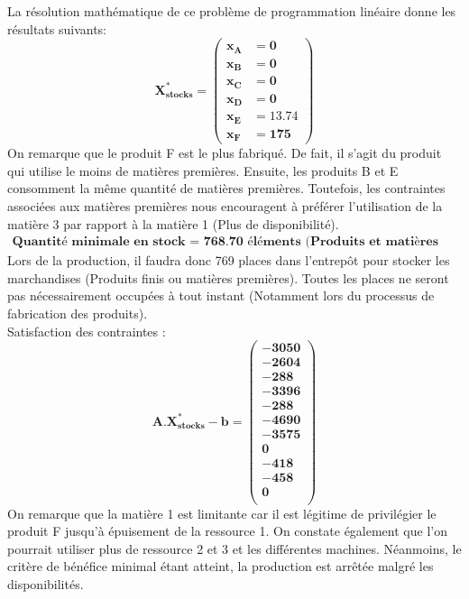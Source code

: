 \documentclass[12pt]{article}
\begin{document}
La résolution mathématique de ce problème de programmation linéaire donne les résultats suivants:
\begin{equation*}
\boldsymbol{X^{*}_{stocks} = 
   \left (
   \begin{aligned}
      x_{A} &= 0 \\
      x_{B} &= 0 \\
      x_{C} &= 0 \\
      x_{D} &= 0 \\
      x_{E} &= 13.74 \\
      x_{F} &= 175 
   \end{aligned}
   \right )
 } 
\end{equation*}
On remarque que le produit F est le plus fabriqué. De fait, il s'agit du produit qui utilise le moins de matières premières. Ensuite, les produits B et E consomment la même quantité de matières premières. Toutefois, les contraintes associées aux matières premières nous encouragent à préférer l'utilisation de la matière 3 par rapport à la matière 1 (Plus de disponibilité).
\begin{align*}
\textbf{Quantité minimale en stock = 768.70 éléments (Produits et matières premières)}
\end{align*}
Lors de la production, il faudra donc 769 places dans l'entrepôt pour stocker les marchandises (Produits finis ou matières premières). Toutes les places ne seront pas nécessairement occupées à tout instant (Notamment lors du processus de fabrication des produits).
\\
Satisfaction des contraintes : 
\begin{equation*}
\boldsymbol{A.X^{*}_{stocks} - b = 
   \left (
   \begin{aligned}
      -3050 \\
      -2604 \\
      -288 \\
      -3396\\
      -288 \\
      -4690 \\
      -3575 \\
      0\\
      -418 \\
      -458\\
      0\\
   \end{aligned}
   \right )
 } 
\end{equation*}
On remarque que la matière 1 est limitante car il est légitime de privilégier le produit F jusqu'à épuisement de la ressource 1.
On constate également que l'on pourrait utiliser plus de ressource 2 et 3 et les différentes machines. Néanmoins, le critère de bénéfice minimal étant atteint, la production est arrêtée malgré les disponibilités.
\end{document}
